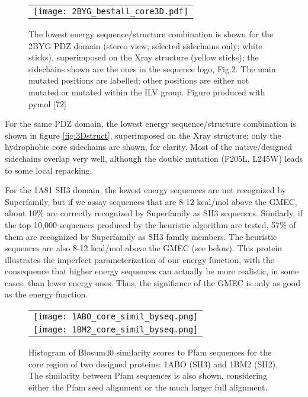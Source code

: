     \begin{figure}[!htbp]
      \centering
      \begin{tabular}{c}
        \texttt{[image: 2BYG\_bestall\_core3D.pdf]} 
      \end{tabular}
      
      \caption[width=1cm]{\small The lowest energy sequence/structure combination is shown for the 2BYG PDZ domain (stereo view; selected sidechains only; white sticks), superimposed on the Xray structure (yellow sticks); the sidechains shown are the ones in the sequence logo, Fig.2. The main mutated positions are labelled; other positions are either not mutated or mutated within the ILV group. Figure produced with pymol [72]}
      \label{fig:logos}
    \end{figure}
For the same PDZ domain, the lowest energy sequence/structure combination is shown in figure \ref{fig:3Dstruct}, superimposed on the Xray structure; only the hydrophobic core sidechains are shown, for clarity. Most of the native/designed sidechains overlap very well, although the double mutation (F205L, L245W) leads to some local repacking.

    For the 1A81 SH3 domain, the lowest energy sequences are not recognized by Superfamily, but if we assay sequences that are 8-12 kcal/mol above the GMEC, about 10\% are correctly recognized by Superfamily as SH3 sequences. Similarly, if the top 10,000 sequences produced by the heuristic algorithm are tested, 57\% of them are recognized by Superfamily as SH3 family members. The heuristic sequences are also 8-12 kcal/mol above the GMEC (see below). This protein illustrates the imperfect parameterization of our energy function, with the consequence that higher energy sequences can actually be more realistic, in some cases, than lower energy ones. Thus, the signifiance of the GMEC is only as good as the energy function.


    \begin{figure}[!htbp]
      \centering
      \begin{tabular}{c}
        \texttt{[image: 1ABO\_core\_simil\_byseq.png]} \\
        \texttt{[image: 1BM2\_core\_simil\_byseq.png]} \\
      \end{tabular}
      \caption[width=1cm]{\small 
Histogram of Blosum40 similarity scores to Pfam sequences for the core region of two
designed proteins: 1ABO (SH3) and 1BM2 (SH2). The similarity between Pfam sequences is
also shown, considering either the Pfam seed alignment or the much larger full alignment.
}
      \label{fig:similarity}
    \end{figure}





